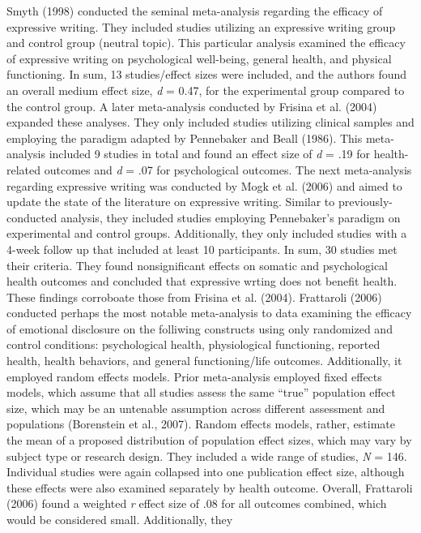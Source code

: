 \documentclass[english,man, mask]{apa6}
\newcounter{author}
\theoremstyle{definition}
\theoremstyle{definition}
\theoremstyle{definition}
\theoremstyle{remark}
\begin{document}
Smyth (1998) conducted the seminal meta-analysis regarding the efficacy
of expressive writing. They included studies utilizing an expressive
writing group and control group (neutral topic). This particular
analysis examined the efficacy of expressive writing on psychological
well-being, general health, and physical functioning. In sum, 13
studies/effect sizes were included, and the authors found an overall
medium effect size, \emph{d} = 0.47, for the experimental group compared
to the control group. A later meta-analysis conducted by Frisina et al.
(2004) expanded these analyses. They only included studies utilizing
clinical samples and employing the paradigm adapted by Pennebaker and
Beall (1986). This meta-analysis included 9 studies in total and found
an effect size of \emph{d} = .19 for health-related outcomes and
\emph{d} = .07 for psychological outcomes. The next meta-analysis
regarding expressive writing was conducted by Mogk et al. (2006) and
aimed to update the state of the literature on expressive writing.
Similar to previously-conducted analysis, they included studies
employing Pennebaker's paradigm on experimental and control groups.
Additionally, they only included studies with a 4-week follow up that
included at least 10 participants. In sum, 30 studies met their
criteria. They found nonsignificant effects on somatic and psychological
health outcomes and concluded that expressive wrting does not benefit
health. These findings corroboate those from Frisina et al. (2004).
Frattaroli (2006) conducted perhaps the most notable meta-analysis to
data examining the efficacy of emotional disclosure on the folliwing
constructs using only randomized and control conditions: psychological
health, physiological functioning, reported health, health behaviors,
and general functioning/life outcomes. Additionally, it employed random
effects models. Prior meta-analysis employed fixed effects models, which
assume that all studies assess the same \enquote{true} population effect
size, which may be an untenable assumption across different assessment
and populations (Borenstein et al., 2007). Random effects models,
rather, estimate the mean of a proposed distribution of population
effect sizes, which may vary by subject type or research design. They
included a wide range of studies, \emph{N} = 146. Individual studies
were again collapsed into one publication effect size, although these
effects were also examined separately by health outcome. Overall,
Frattaroli (2006) found a weighted \emph{r} effect size of .08 for all
outcomes combined, which would be considered small. Additionally, they
\end{document}
